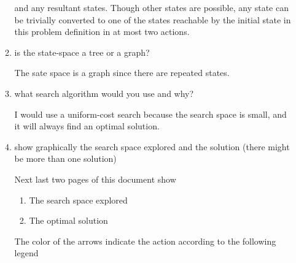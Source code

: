\documentclass[11pt]{article}  %
\begin{document}
\begin{enumerate}
\begin{enumerate}
      and any resultant states.  Though other states are possible, any state can
      be trivially converted to one of the states reachable by the initial state
      in this problem definition in at most two actions.
      \item is the state-space a tree or a graph?
      \par
      The sate space is a graph since there are repeated states.
      \item what search algorithm would you use and why?
      \par 
      I would use a uniform-cost search because the search space is small, and
      it will always find an optimal solution.
      \item show graphically the search space explored and the solution (there
      might be more than one solution)
      \par
      Next last two pages of this document show 
        \begin{enumerate}
          \item The search space explored
          \item The optimal solution
        \end{enumerate}
    The color of the arrows indicate the action according to the following
    legend
    \par{}
\end{enumerate}
\end{enumerate}
\end{document}
